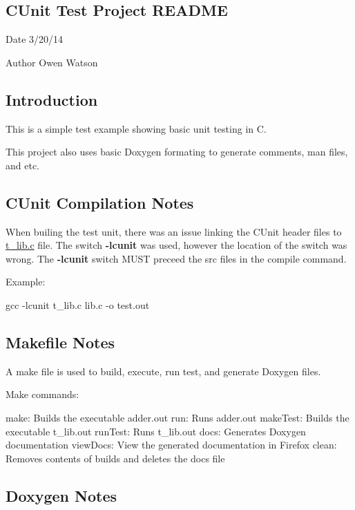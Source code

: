 \subsection*{C\+Unit Test Project R\+E\+A\+D\+M\+E}

\begin{DoxyDate}{Date}
3/20/14 
\end{DoxyDate}
\begin{DoxyAuthor}{Author}
Owen Watson
\end{DoxyAuthor}
\subsection*{Introduction}

This is a simple test example showing basic unit testing in C.

This project also uses basic Doxygen formating to generate comments, man files, and etc.

\subsection*{C\+Unit Compilation Notes}

When builing the test unit, there was an issue linking the C\+Unit header files to \hyperlink{t__lib_8c}{t\+\_\+lib.\+c} file. The switch {\bfseries -\/lcunit} was used, however the location of the switch was wrong. The {\bfseries -\/lcunit} switch M\+U\+S\+T preceed the src files in the compile command.

Example\+: \begin{DoxyVerb}gcc -lcunit t_lib.c lib.c -o test.out
\end{DoxyVerb}


\subsection*{Makefile Notes}

A make file is used to build, execute, run test, and generate Doxygen files.

Make commands\+: \begin{DoxyVerb}make:       Builds the executable adder.out
run:        Runs adder.out
makeTest:   Builds the executable t_lib.out
runTest:    Runs t_lib.out
docs:       Generates Doxygen documentation
viewDocs:   View the generated documentation in Firefox
clean:      Removes contents of builds and deletes the docs file
\end{DoxyVerb}


\subsection*{Doxygen Notes}

